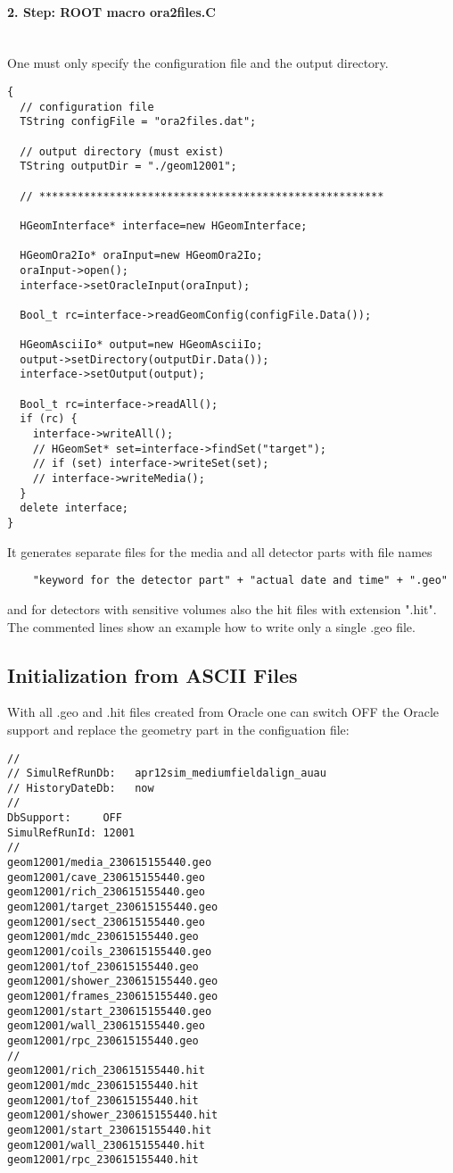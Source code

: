 \paragraph{2. Step: ROOT macro ora2files.C} ~\\
One must only specify the configuration file and the output directory. 
\begin{lstlisting}
{
  // configuration file
  TString configFile = "ora2files.dat";

  // output directory (must exist)
  TString outputDir = "./geom12001";

  // ******************************************************

  HGeomInterface* interface=new HGeomInterface;

  HGeomOra2Io* oraInput=new HGeomOra2Io;
  oraInput->open();
  interface->setOracleInput(oraInput);

  Bool_t rc=interface->readGeomConfig(configFile.Data());

  HGeomAsciiIo* output=new HGeomAsciiIo;
  output->setDirectory(outputDir.Data());
  interface->setOutput(output);

  Bool_t rc=interface->readAll();
  if (rc) {
    interface->writeAll();
    // HGeomSet* set=interface->findSet("target");
    // if (set) interface->writeSet(set);
    // interface->writeMedia();
  }
  delete interface;
}
\end{lstlisting}

It generates separate files for the media and all detector parts with file names
\begin{lstlisting}
    "keyword for the detector part" + "actual date and time" + ".geo"
\end{lstlisting}
and for detectors with sensitive volumes also the hit files with extension ".hit".\\

The commented lines show an example how to write only a single .geo file.


\subsection[Initialization from ASCII Files]{Initialization from ASCII Files}
With all .geo and .hit files created from Oracle one can switch OFF the Oracle support and replace the geometry part in 
the configuation file:
\begin{lstlisting}
//
// SimulRefRunDb:   apr12sim_mediumfieldalign_auau
// HistoryDateDb:   now
//
DbSupport:     OFF
SimulRefRunId: 12001
//
geom12001/media_230615155440.geo
geom12001/cave_230615155440.geo
geom12001/rich_230615155440.geo
geom12001/target_230615155440.geo
geom12001/sect_230615155440.geo
geom12001/mdc_230615155440.geo
geom12001/coils_230615155440.geo
geom12001/tof_230615155440.geo
geom12001/shower_230615155440.geo
geom12001/frames_230615155440.geo
geom12001/start_230615155440.geo
geom12001/wall_230615155440.geo
geom12001/rpc_230615155440.geo
//
geom12001/rich_230615155440.hit
geom12001/mdc_230615155440.hit
geom12001/tof_230615155440.hit
geom12001/shower_230615155440.hit
geom12001/start_230615155440.hit
geom12001/wall_230615155440.hit
geom12001/rpc_230615155440.hit
\end{lstlisting}

